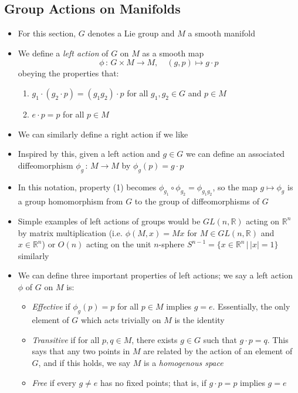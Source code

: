 \documentclass[12pt,a4paper]{article}
\numberwithin{equation}{section}
\begin{document}
	\subsection{Group Actions on Manifolds}
	\begin{itemize}
		\item For this section, $G$ denotes a Lie group and $M$ a smooth manifold
		\item We define a \textit{left action} of $G$ on $M$ as a smooth map
		\begin{equation}
			\phi\,:\,G\times M\to M,\quad (g,p)\mapsto g\cdot p
		\end{equation}
		obeying the properties that:
		\begin{enumerate}
			\item $g_{1}\cdot(g_{2}\cdot p)=(g_{1}g_{2})\cdot p$ for all $g_{1},g_{2}\in G$ and $p\in M$
			\item $e\cdot p=p$ for all $p\in M$
		\end{enumerate}
		\item We can similarly define a right action if we like
		\item Inspired by this, given a left action and $g\in G$ we can define an associated diffeomorphism $\phi_{g}\,:\,M\to M$ by $\phi_{g}(p)=g\cdot p$
		\item In this notation, property (1) becomes $\phi_{g_{1}}\circ \phi_{g_{2}}=\phi_{g_{1}g_{2}}$, so the map $g\mapsto \phi_{g}$ is a group homomorphism from $G$ to the group of diffeomorphisms of $G$
		\item Simple examples of left actions of groups would be $GL(n,\mathbb{R})$ acting on $\mathbb{R}^{n}$ by matrix multiplication (i.e. $\phi(M,x)=Mx$ for $M\in GL(n,\mathbb{R})$ and $x\in\mathbb{R}^{n}$) or $O(n)$ acting on the unit $n$-sphere $S^{n-1}=\{x\in\mathbb{R}^{n}\,|\,\lvert x\rvert=1\}$ similarly
		\item We can define three important properties of left actions; we say a left action $\phi$ of $G$ on $M$ is:
		\begin{itemize}
			\item \textit{Effective} if $\phi_{g}(p)=p$ for all $p\in M$ implies $g=e$. Essentially, the only element of $G$ which acts trivially on $M$ is the identity
			\item \textit{Transitive} if for all $p,q\in M$, there exists $g\in G$ such that $g\cdot p=q$. This says that any two points in $M$ are related by the action of an element of $G$, and if this holds, we say $M$ is a \textit{homogenous space}
			\item \textit{Free} if every $g\neq e$ has no fixed points; that is, if $g\cdot p=p$ implies $g=e$

\end{itemize}
\end{itemize}
\end{document}
